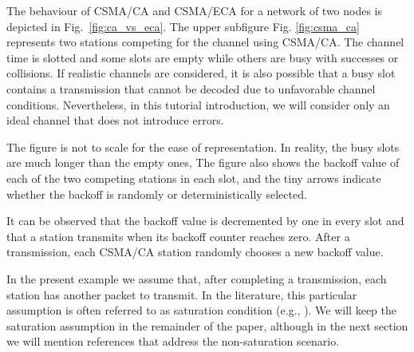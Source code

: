 \documentclass[journal]{IEEEtran}
\begin{document}
The behaviour of CSMA/CA and CSMA/ECA for a network of two nodes is depicted in Fig.~\ref{fig:ca_vs_eca}.
The upper subfigure Fig. \ref{fig:csma_ca} represents two stations competing for the channel using CSMA/CA.
The channel time is slotted and some slots are empty while others are busy with successes or collisions.
If realistic channels are considered, it is also possible that a busy slot contains a transmission that cannot be decoded due to unfavorable channel conditions.
Nevertheless, in this tutorial introduction, we will consider only an ideal channel that does not introduce errors.

The figure is not to scale for the ease of representation.
In reality, the busy slots are much longer than the empty ones, 
The figure also shows the backoff value of each of the two competing stations in each slot, and the tiny arrows indicate whether the backoff is randomly or deterministically selected.

It can be observed that the backoff value is decremented by one in every slot and that a station transmits when its backoff counter reaches zero.
After a transmission, each CSMA/CA station randomly chooses a new backoff value.

In the present example we assume that, after completing a transmission, each station has another packet to transmit.
In the literature, this particular assumption is often referred to as saturation condition (e.g., \cite{he2009srb,barcelo2010fcc,fang2011dlm,barcelo2011tcf}).
We will keep the saturation assumption in the remainder of the paper, although in the next section we will mention references that address the non-saturation scenario.
\end{document}

